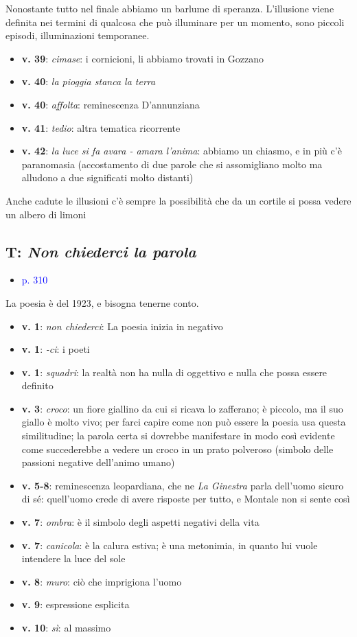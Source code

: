 \documentclass[a4paper, twoside, titlepage]{book}
\newcounter{mar}
\newcommand{\elenco}[1]{%
\begin{itemize}
#1
\end{itemize}}
\renewcommand{\emph}[1]{\textcolor{blue}{#1}}
\begin{document}
Nonostante tutto nel finale abbiamo un barlume di speranza. L'illusione viene definita nei termini di qualcosa che può illuminare per un momento, sono piccoli episodi, illuminazioni temporanee.

\elenco{\item \textbf{v. 39}: \textit{cimase}: i cornicioni, li abbiamo trovati in Gozzano\item \textbf{v. 40}: \textit{la pioggia stanca la terra}\item \textbf{v. 40}: \textit{affolta}: reminescenza D'annunziana\item \textbf{v. 41}: \textit{tedio}: altra tematica ricorrente\item \textbf{v. 42}: \textit{la luce si fa avara - amara l'anima}: abbiamo un chiasmo, e in più c'è paranomasia (accostamento di due parole che si assomigliano molto ma alludono a due significati molto distanti)}

Anche cadute le illusioni c'è sempre la possibilità che da un cortile si possa vedere un albero di limoni

\subsection{T: \textit{Non chiederci la parola}}
\elenco{\item \emph{p. 310}}

La poesia è del 1923, e bisogna tenerne conto.

\elenco{\item \textbf{v. 1}: \textit{non chiederci}: La poesia inizia in negativo\item \textbf{v. 1}: \textit{-ci}: i poeti\item \textbf{v. 1}: \textit{squadri}: la realtà non ha nulla di oggettivo e nulla che possa essere definito\item \textbf{v. 3}: \textit{croco}: un fiore giallino da cui si ricava lo zafferano; è piccolo, ma il suo giallo è molto vivo; per farci capire come non può essere la poesia usa questa similitudine; la parola certa si dovrebbe manifestare in modo così evidente come succederebbe a vedere un croco in un prato polveroso (simbolo delle passioni negative dell'animo umano)\item \textbf{v. 5-8}: reminescenza leopardiana, che ne \textit{La Ginestra} parla dell'uomo sicuro di sé: quell'uomo crede di avere risposte per tutto, e Montale non si sente così\item \textbf{v. 7}: \textit{ombra}: è il simbolo degli aspetti negativi della vita\item \textbf{v. 7}: \textit{canicola}: è la calura estiva; è una metonimia, in quanto lui vuole intendere la luce del sole\item \textbf{v. 8}: \textit{muro}: ciò che imprigiona l'uomo\item \textbf{v. 9}: espressione esplicita\item \textbf{v. 10}: \textit{sì}: al massimo}
\end{document}
